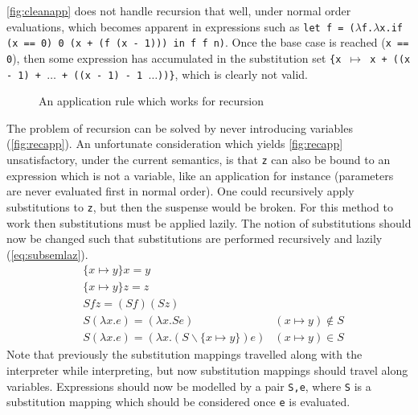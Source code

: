 \documentclass[11pt,oneside,a4paper]{report}
\begin{document}
\autoref{fig:cleanapp} does not handle recursion that well, under normal order evaluations, which becomes apparent in expressions such as \texttt{let f = ($\lambda$f.$\lambda$x.if (x == 0) 0 (x + (f (x - 1))) in f f n)}.
Once the base case is reached (\texttt{x == 0}), then some expression has accumulated in the substitution set \texttt{\{x $\mapsto$ x + ((x - 1) + $\dots$ + ((x - 1) - 1 $\dots$))\}}, which is clearly not valid.
\begin{figure}[ht]
    \begin{mdframed}[style=style1]
        \vspace*{0.4cm}
          \begin{prooftree}
          \end{prooftree}   
    \end{mdframed}
    \caption{An application rule which works for recursion}
    \label{fig:recapp}
\end{figure}
\noindent The problem of recursion can be solved by never introducing variables (\autoref{fig:recapp}).
An unfortunate consideration which yields \autoref{fig:recapp} unsatisfactory, under the current semantics, is that \texttt{z} can also be bound to an expression which is not a variable, like an application for instance (parameters are never evaluated first in normal order).
One could recursively apply substitutions to \texttt{z}, but then the suspense would be broken.
For this method to work then substitutions must be applied lazily.
The notion of substitutions should now be changed such that substitutions are performed recursively and lazily (\autoref{eq:subsemlaz}).
\begin{align}
  &\{ x \mapsto y \} x = y &\label{eq:subsemlaz}\\
  &\{ x \mapsto y \} z = z  &\tag*{}\\
  &S f z = (Sf)(Sz) &\tag*{}\\
  &S (\lambda x.e) = (\lambda x.Se) & (x \mapsto y) \notin S \tag*{}\\
  &S (\lambda x.e) = (\lambda x.(S \backslash \{x \mapsto y\})e) & (x \mapsto y) \in S \label{eq:subsemlaz2}
\end{align}
Note that previously the substitution mappings travelled along with the interpreter while interpreting, but now substitution mappings should travel along variables.
Expressions should now be modelled by a pair \texttt{S,e}, where \texttt{S} is a substitution mapping which should be considered once \texttt{e} is evaluated. 
\end{document}

